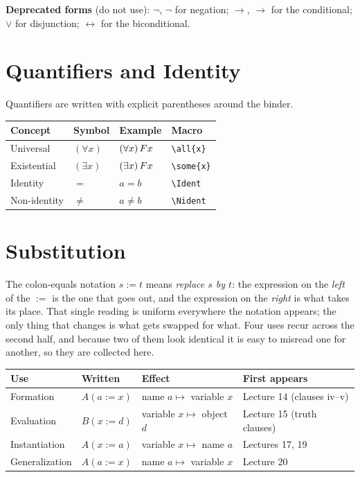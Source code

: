 \documentclass[11pt]{article}
\begin{document}
\noindent
\textbf{Deprecated forms} (do not use): $\lnot$, $\neg$ for negation; $\to$, $\rightarrow$ for the conditional; $\lor$ for disjunction; $\leftrightarrow$ for the biconditional.

\section{Quantifiers and Identity}

Quantifiers are written with explicit parentheses around the binder.

\begin{center}
\begin{tabular}{@{}llll@{}}
\toprule
Concept & Symbol & Example & Macro \\
\midrule
Universal    & $(\forall x)$ & $(\forall x)\,Fx$        & \verb|\all{x}| \\
Existential  & $(\exists x)$ & $(\exists x)\,Fx$       & \verb|\some{x}| \\
Identity     & $=$       & $a = b$                  & \verb|\Ident| \\
Non-identity & $\neq$    & $a \neq b$               & \verb|\Nident| \\
\bottomrule
\end{tabular}
\end{center}

\section{Substitution}

The colon-equals notation $s := t$ means \emph{replace $s$ by $t$}: the expression on the \emph{left} of the $:=$ is the one that goes out, and the expression on the \emph{right} is what takes its place. That single reading is uniform everywhere the notation appears; the only thing that changes is what gets swapped for what. Four uses recur across the second half, and because two of them look identical it is easy to misread one for another, so they are collected here.

\begin{center}
\begin{tabular}{@{}llll@{}}
\toprule
Use & Written & Effect & First appears \\
\midrule
Formation      & $A(a := x)$ & name $a \mapsto$ variable $x$   & Lecture 14 (clauses iv--v) \\
Evaluation     & $B(x := d)$ & variable $x \mapsto$ object $d$ & Lecture 15 (truth clauses) \\
Instantiation  & $A(x := a)$ & variable $x \mapsto$ name $a$   & Lectures 17, 19 \\
Generalization & $A(a := x)$ & name $a \mapsto$ variable $x$   & Lecture 20 \\
\bottomrule
\end{tabular}
\end{center}
\end{document}
